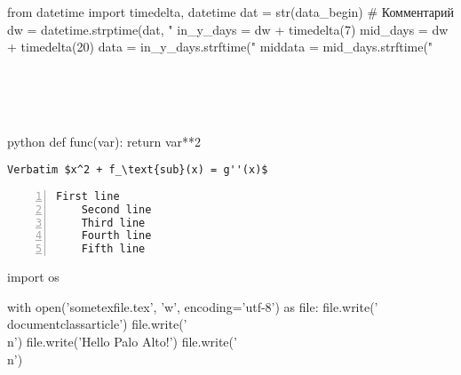 \begin{pycode}	
from datetime import timedelta, datetime
dat = str(data_begin)
# Комментарий
dw = datetime.strptime(dat, "%
in_y_days = dw + timedelta(7)
mid_days = dw + timedelta(20)
data = in_y_days.strftime("%
middata = mid_days.strftime("%

\end{pycode}
\\
\\
\\
\begin{pygments}{python}
    def func(var):
    return var**2
\end{pygments}


\begin{Verbatim}[commandchars=\\\{\},
	mathescape]
	Verbatim $x^2 + f_\text{sub}(x) = g''(x)$
\end{Verbatim}

\begin{Verbatim}[numbers=left,
	highlightlines={1, 3-4}]
	First line
	Second line
	Third line
	Fourth line
	Fifth line
\end{Verbatim}


\begin{pycode}
import os

with open('sometexfile.tex', 'w', encoding='utf-8') as file:
    file.write('\\documentclass{article}\n')
    file.write('\\n')
    file.write('Hello Palo Alto!\n')
    file.write('\\n')
\end{pycode}